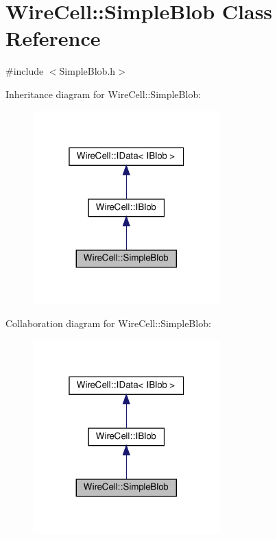 \hypertarget{class_wire_cell_1_1_simple_blob}{}\section{Wire\+Cell\+:\+:Simple\+Blob Class Reference}
\label{class_wire_cell_1_1_simple_blob}


{\ttfamily \#include $<$Simple\+Blob.\+h$>$}



Inheritance diagram for Wire\+Cell\+:\+:Simple\+Blob\+:
\nopagebreak
\begin{figure}[H]
\begin{center}
\leavevmode
\includegraphics[width=205pt]{class_wire_cell_1_1_simple_blob__inherit__graph}
\end{center}
\end{figure}


Collaboration diagram for Wire\+Cell\+:\+:Simple\+Blob\+:
\nopagebreak
\begin{figure}[H]
\begin{center}
\leavevmode
\includegraphics[width=205pt]{class_wire_cell_1_1_simple_blob__coll__graph}
\end{center}
\end{figure}
